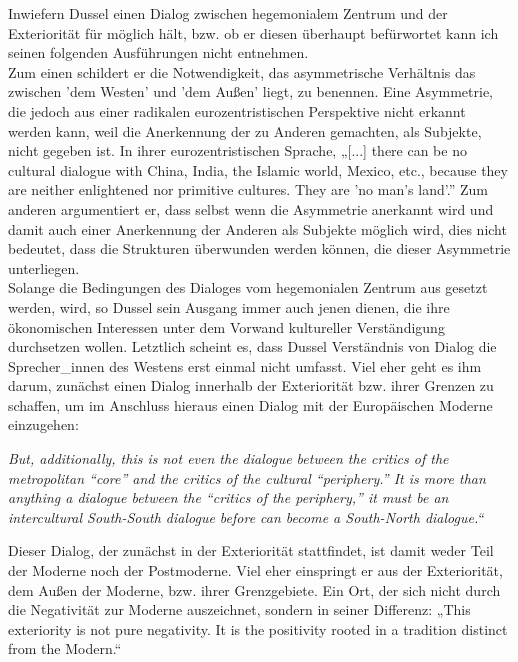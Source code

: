 Inwiefern Dussel einen Dialog zwischen hegemonialem Zentrum und der Exteriorität
für möglich hält, bzw. ob er diesen überhaupt befürwortet kann ich seinen
folgenden Ausführungen nicht entnehmen. \\
Zum einen schildert er die
Notwendigkeit, das asymmetrische Verhältnis das zwischen 'dem Westen' und 'dem
Außen' liegt, zu benennen. Eine Asymmetrie, die jedoch aus einer radikalen
eurozentristischen Perspektive nicht erkannt werden kann, weil die Anerkennung
der zu Anderen gemachten, als Subjekte, nicht gegeben ist. In ihrer
eurozentristischen Sprache,  „[...] there can be no cultural dialogue with
China, India, the Islamic world, Mexico, etc., because they are neither
enlightened nor primitive cultures. They are 'no man's land'.”\footnotemark
{} Zum anderen argumentiert er, dass selbst wenn die
Asymmetrie anerkannt wird und damit auch einer Anerkennung der Anderen als
Subjekte möglich wird, dies nicht bedeutet, dass die Strukturen überwunden
werden können, die dieser Asymmetrie unterliegen.\\
 Solange die Bedingungen des
Dialoges vom hegemonialen Zentrum aus gesetzt werden, wird, so Dussel sein
Ausgang immer auch jenen dienen, die ihre ökonomischen Interessen unter dem
Vorwand kultureller Verständigung durchsetzen wollen.\footnotemark
{} Letztlich scheint es, dass Dussel Verständnis von Dialog die
Sprecher\_innen des Westens erst einmal nicht umfasst. Viel eher geht es ihm
darum, zunächst einen Dialog innerhalb der Exteriorität bzw. ihrer Grenzen zu
schaffen, um im Anschluss hieraus einen Dialog mit der Europäischen Moderne
einzugehen:
\begin{myenv}
    \textit{But, additionally, this is not even the dialogue between the critics of the metropolitan “core” and the critics of the cultural “periphery.” It is more than anything a dialogue between the “critics of the periphery,” it must be an intercultural South-South dialogue before can become a South-North dialogue.“\footnotemark {}}
\end{myenv}

Dieser Dialog, der zunächst in der Exteriorität stattfindet, ist damit weder
Teil der Moderne noch der Postmoderne. Viel eher einspringt er aus der
Exteriorität, dem Außen der Moderne, bzw. ihrer Grenzgebiete. Ein Ort, der sich
nicht durch die Negativität zur Moderne auszeichnet, sondern in seiner
Differenz: „This exteriority is not pure negativity. It is the positivity rooted
in a tradition distinct from the Modern.“\footnotemark {}
\\

